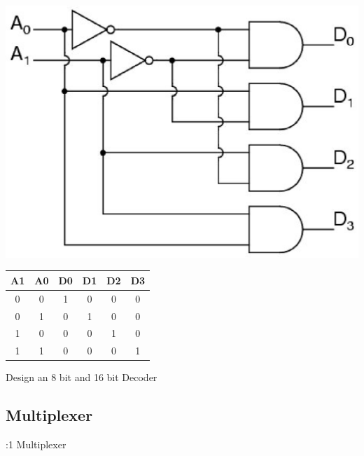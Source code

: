 \documentclass[journal,12pt,twocolumn]{IEEEtran}
\begin{document}
\vspace{0.5cm}
\includegraphics[scale=0.5]{img/24decoder}
\begin{table}[h!]
\centering
\begin{tabular}{|cc|cccc|}
\hline
A1	&	A0	&	D0	&	D1	&	D2	&	D3	 \\\hline
0	&	0	&	1	&	0	&	0	&	0	 	\\\hline
0	&	1	&	0	&	1	&	0	&	0		\\\hline
1	&	0	&	0	&	0	&	1	&	0		\\\hline
1	&	1	&	0	&	0	&	0	&	1		\\\hline

\end{tabular}
\end{table}

\problem Design an 8 bit and 16 bit Decoder
\subsection{Multiplexer}
:1 Multiplexer
\end{document}
